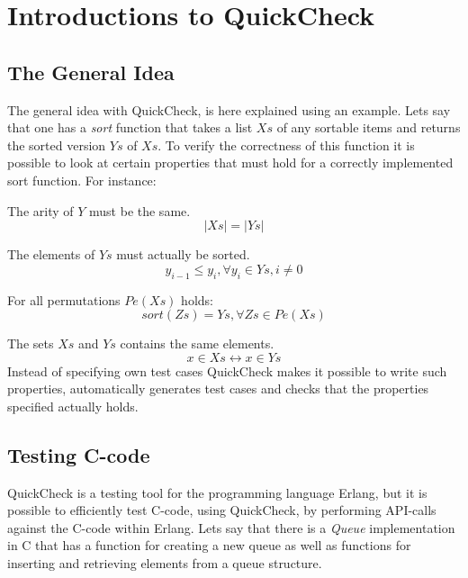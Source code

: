 \chapter{Introductions to QuickCheck}
\label{APP:QUICKCHECK}
\lstset{style=erlang}
\label{SEC:QuickCheckIntro}

\section{The General Idea}
The general idea with QuickCheck, is here explained using an example.
Lets say that one has a \emph{sort} function that takes a list $Xs$ of any
sortable items and returns the sorted version $Ys$ of $Xs$. To verify the
correctness of this function it is possible to look at certain properties
that must hold for a correctly implemented sort function. For instance:

\noindent The arity of $Y$ must be the same.
\begin{equation}
        |Xs| = |Ys|
\end{equation}

\noindent The elements of $Ys$ must actually be sorted.
\begin{equation}
    y_{i-1} \leq y_i, \forall y_i \in Ys, i \neq 0
\end{equation}

\noindent For all permutations $Pe(Xs)$ holds:
\begin{equation}
sort(Zs) = Ys, \forall Zs \in Pe(Xs)
\end{equation}

\noindent The sets $Xs$ and $Ys$ contains the same elements.
\begin{equation}
        x \in Xs \leftrightarrow x \in Ys
\end{equation}
Instead of specifying own test cases QuickCheck makes it possible to write such
properties, automatically generates test cases and checks that the properties
specified actually holds.

\section{Testing C-code}
QuickCheck is a testing tool for the programming language Erlang, but it is
possible to efficiently test C-code, using QuickCheck, by performing API-calls
against the C-code within Erlang.  Lets say that there is a \emph{Queue}
implementation in C that has a function for creating a new queue as well
as functions for inserting and retrieving elements from a queue structure.

